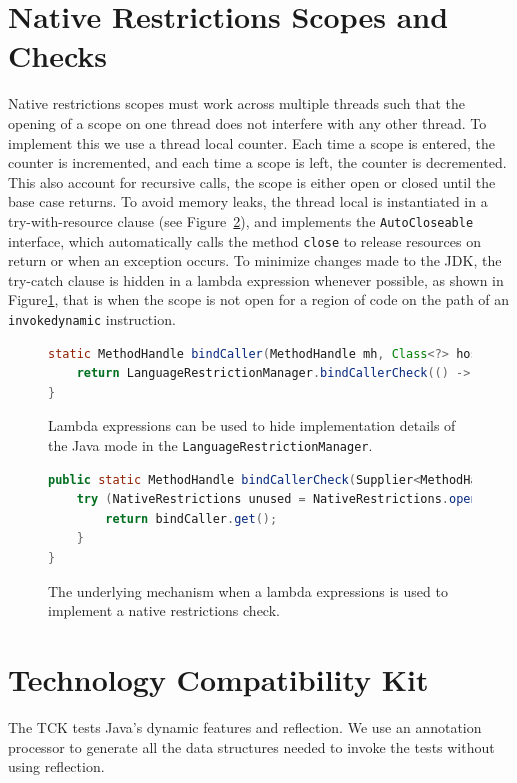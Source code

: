 \section{Native Restrictions Scopes and Checks}
Native restrictions scopes must work across multiple threads such that the opening of a scope on one thread does not interfere with any other thread. To implement this we use a thread local counter.
Each time a scope is entered, the counter is incremented, and each time a scope is left, the counter is decremented. 
This also account for recursive calls, the scope is either open or closed until the base case returns.
To avoid memory leaks, the thread local is instantiated in a try-with-resource clause (see Figure~\ref{fig:bind_caller_lrm}), and implements the \verb|AutoCloseable| interface, which automatically calls the method \verb|close| to release resources on return or when an exception occurs.
To minimize changes made to the JDK, the try-catch clause is hidden in a lambda expression whenever possible, as shown in Figure\ref{fig:bind_caller_lambda}, that is when the scope is not open for a region of code on the path of an \verb|invokedynamic| instruction.

\begin{figure}[ht]
    \centering
\begin{lstlisting}[language=Java]
static MethodHandle bindCaller(MethodHandle mh, Class<?> hostClass) {
    return LanguageRestrictionManager.bindCallerCheck(() -> BindCaller.bindCaller(mh, hostClass));
}
\end{lstlisting}
    \caption{Lambda expressions can be used to hide implementation details of the Java mode in the \texttt{LanguageRestrictionManager}.}
    \label{fig:bind_caller_lambda}
\end{figure}

\begin{figure}[ht]
    \centering
\begin{lstlisting}[language=Java]
public static MethodHandle bindCallerCheck(Supplier<MethodHandle> bindCaller) {
    try (NativeRestrictions unused = NativeRestrictions.openScope()) {
        return bindCaller.get();
    }
}
\end{lstlisting}
    \caption{The underlying mechanism when a lambda expressions is used to implement a native restrictions check.}
    \label{fig:bind_caller_lrm}
\end{figure}

\section{Technology Compatibility Kit}\label{TCK}
The TCK tests Java's dynamic features and reflection.
We use an annotation processor to generate all the data structures needed to invoke the tests without using reflection. 

